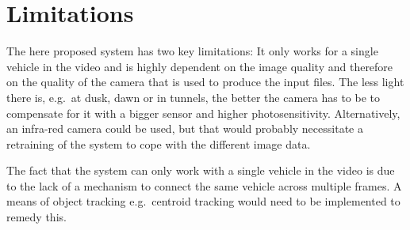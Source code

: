 \section{Limitations}\label{sec:limitations}

The here proposed system has two key limitations: It only works for a single vehicle in the video and is highly dependent on the image quality and therefore on the quality of the camera that is used to produce the input files.
The less light there is, e.g.\ at dusk, dawn or in tunnels, the better the camera has to be to compensate for it with a bigger sensor and higher photosensitivity.
Alternatively, an infra-red camera could be used, but that would probably necessitate a retraining of the system to cope with the different image data.

The fact that the system can only work with a single vehicle in the video is due to the lack of a mechanism to connect the same vehicle across multiple frames.
A means of object tracking e.g.\ centroid tracking would need to be implemented to remedy this.
